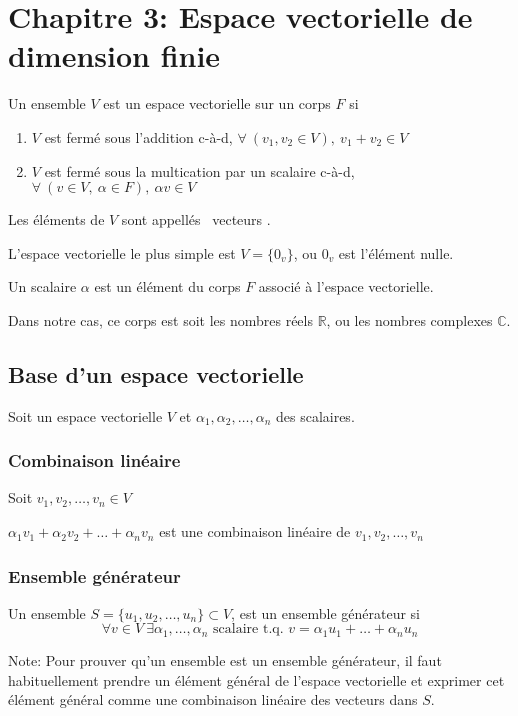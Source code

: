 \section{Chapitre 3: Espace vectorielle de dimension finie}
\begin{definition}
      Un ensemble $V$ est un espace vectorielle sur un corps $F$
      si \begin{enumerate}[1)]
            \item $V$ est fermé sous l'addition c-à-d, $
                        \forall \ (v_1, v_2 \in V), \ v_1 + v_2 \in V
                  $
            \item $V$ est fermé sous la multication par un scalaire c-à-d, $
                        \forall \ (v \in V, \ \alpha \in F), \ \alpha v \in V
                  $
      \end{enumerate}
      Les éléments de $V$ sont appellés \guillemetleft \ vecteurs \guillemetright.
\end{definition}
\begin{remark}
      L'espace vectorielle le plus simple est $V = \{ 0_v \}$, ou $0_v$ est l'élément nulle.
\end{remark}
\begin{definition}
      Un scalaire $\alpha$ est un élément du corps $F$ associé à l'espace vectorielle.
\end{definition}
\noindent
Dans notre cas, ce corps est soit les nombres réels $\mathbb{R}$, ou les nombres complexes $\mathbb{C}$.

\subsection{Base d'un espace vectorielle}
\noindent
Soit un espace vectorielle $V$ et $\alpha_1, \alpha_2, \ldots, \alpha_n$ des scalaires.

\subsubsection{Combinaison linéaire}
\noindent
Soit $v_1, v_2, \ldots, v_n \in V$
\begin{definition}
      $\alpha_1 v_1 + \alpha_2 v_2 + \ldots + \alpha_n v_n$ est une combinaison linéaire de
      $v_1, v_2, \ldots, v_n$
\end{definition}

\subsubsection{Ensemble générateur}
\begin{definition}
      Un ensemble $S = \{ u_1, u_2, \ldots, u_n \} \subset V$, est un ensemble générateur si
      \[ \forall v \in V  \ \exists \alpha_1, \ldots, \alpha_n \text{ scalaire t.q. } v = \alpha_1 u_1 + \ldots + \alpha_n u_n\]
\end{definition}
\noindent
Note: Pour prouver qu'un ensemble est un ensemble générateur, il faut habituellement
prendre un élément général de l'espace vectorielle et exprimer cet élément général
comme une combinaison linéaire des vecteurs dans $S$.

